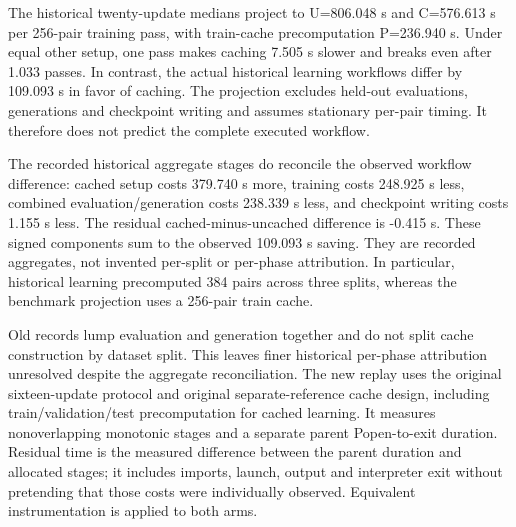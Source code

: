 \documentclass[10pt]{article}
\begin{document}
The historical twenty-update medians project to U=806.048 s and C=576.613 s per 256-pair training pass, with train-cache precomputation P=236.940 s. Under equal other setup, one pass makes caching 7.505 s slower and breaks even after 1.033 passes. In contrast, the actual historical learning workflows differ by 109.093 s in favor of caching. The projection excludes held-out evaluations, generations and checkpoint writing and assumes stationary per-pair timing. It therefore does not predict the complete executed workflow.


The recorded historical aggregate stages do reconcile the observed workflow difference: cached setup costs 379.740 s more, training costs 248.925 s less, combined evaluation/generation costs 238.339 s less, and checkpoint writing costs 1.155 s less. The residual cached-minus-uncached difference is -0.415 s. These signed components sum to the observed 109.093 s saving. They are recorded aggregates, not invented per-split or per-phase attribution. In particular, historical learning precomputed 384 pairs across three splits, whereas the benchmark projection uses a 256-pair train cache.


Old records lump evaluation and generation together and do not split cache construction by dataset split. This leaves finer historical per-phase attribution unresolved despite the aggregate reconciliation. The new replay uses the original sixteen-update protocol and original separate-reference cache design, including train/validation/test precomputation for cached learning. It measures nonoverlapping monotonic stages and a separate parent Popen-to-exit duration. Residual time is the measured difference between the parent duration and allocated stages; it includes imports, launch, output and interpreter exit without pretending that those costs were individually observed. Equivalent instrumentation is applied to both arms.
\end{document}
